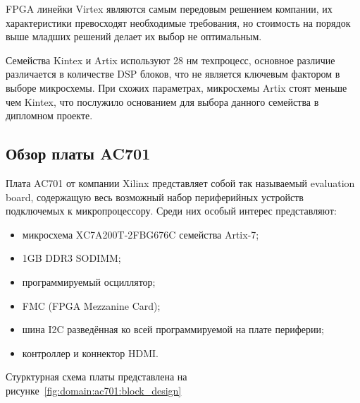 FPGA линейки Virtex являются самым передовым решением компании, их характеристики превосходят необходимые требования,
но стоимость на порядок выше младших решений делает их выбор не оптимальным.

Семейства Kintex и Artix используют 28 нм техпроцесс, основное различие различается в количестве DSP блоков, что не является
ключевым фактором в выборе микросхемы. При схожих параметрах, микросхемы Artix стоят меньше чем Kintex\cite{artix_kintex_price_comparison},
что послужило основанием для выбора данного семейства в дипломном проекте.





\subsection{Обзор платы AC701}
\label{sub:domain:ac701}

Плата AC701 от компании Xilinx представляет собой так называемый evaluation board,
содержащую весь возможный набор периферийных устройств подключемых к микропроцессору.
Среди них особый интерес представляют:
\begin{itemize}
  \item микросхема XC7A200T-2FBG676C семейства Artix-7;
  \item 1GB DDR3 SODIMM;
  \item программируемый осциллятор;
  \item FMC (FPGA Mezzanine Card);
  \item шина I2C разведённая ко всей программируемой на плате периферии;
  \item контроллер и коннектор HDMI.
\end{itemize}

Стурктурная схема платы представлена на рисунке~\ref{fig:domain:ac701:block_design}

